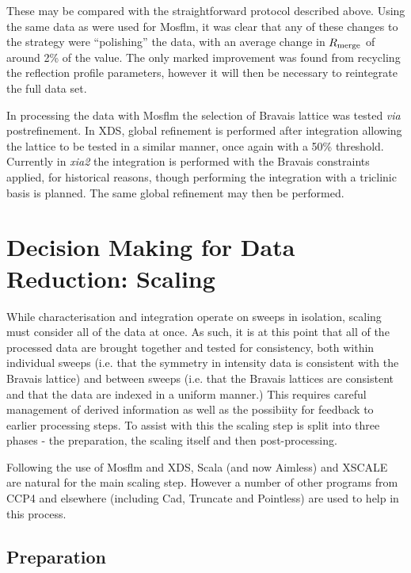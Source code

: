 \documentclass[preprint,pdf]{iucr}
\begin{document}
\noindent
These may be compared with the straightforward protocol described above. Using
the same data as were used for Mosflm, it was
clear that any of these changes to the strategy were ``polishing'' the
data, with an average change in $R_{\rm{merge}}$ of around 2\% of the
value. The only marked improvement was found from recycling the
reflection profile parameters, however it will then be necessary
to reintegrate the full data set.

In processing the data with Mosflm the selection of Bravais lattice
was tested \emph{via} postrefinement. In XDS, global refinement is
performed after integration allowing the lattice to be tested in a
similar manner, once again with a 50\% threshold. Currently in
\emph{xia2} the integration is performed with the Bravais constraints
applied, for historical reasons, though performing the integration
with a triclinic basis is planned. The same global refinement may then
be performed.

\section{Decision Making for Data Reduction: Scaling}

While characterisation and integration operate on sweeps in isolation,
scaling must consider all of the data at once. As such, it is at this
point that all of the processed data are brought together and tested
for consistency, both within individual sweeps (i.e. that the symmetry
in intensity data is consistent with the Bravais lattice) and between
sweeps (i.e. that the Bravais lattices are consistent and that the
data are indexed in a uniform manner.) This requires careful
management of derived information as well as the possibiity for feedback to
earlier processing steps. To assist with this the scaling step is
split into three phases - the preparation, the scaling itself and then
post-processing.

Following the use of Mosflm and XDS, Scala (and now Aimless) and
XSCALE are natural for the main scaling step. However a number of other
programs from CCP4 and elsewhere (including Cad, Truncate and
Pointless) are used to help in this process.

\subsection{Preparation}
\end{document}
